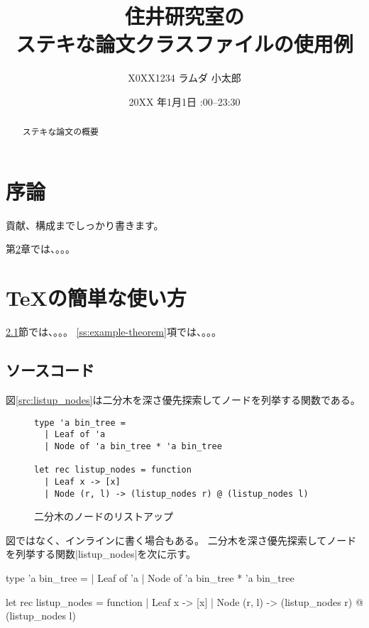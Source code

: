 \documentclass[uplatex]{sumiilab-paper}
\title{住井研究室の\\ステキな論文クラスファイルの使用例}
\author{X0XX1234 ラムダ 小太郎}
\institute{東北大学 工学部\\電気情報物理工学科}%
\date{20XX 年1月1日 \quad 23:00--23:30}
\theoremstyle{mystyle}
\numberwithin{definition}{chapter} %
\begin{document}
\frontmatter%

\maketitle

\begin{abstract}
ステキな論文の概要
\end{abstract}

\tableofcontents%

\mainmatter%

\chapter{序論}

貢献、構成までしっかり書きます。

\cite{Pierce:TypeSystems}

第\ref{c:how-to-use-tex}章では、。。。

\chapter{\TeX の簡単な使い方}
\label{c:how-to-use-tex}

\ref{s:source-code}節では、。。。
\ref{ss:example-theorem}項では、。。。

\section{ソースコード}
\label{s:source-code}

図\ref{src:listup_nodes}は二分木を深さ優先探索してノードを列挙する関数である。
\begin{figure}[t]
\begin{lstlisting}[label=src:listup_nodes]
type 'a bin_tree =
  | Leaf of 'a
  | Node of 'a bin_tree * 'a bin_tree

let rec listup_nodes = function
  | Leaf x -> [x]
  | Node (r, l) -> (listup_nodes r) @ (listup_nodes l)
\end{lstlisting}
\caption{二分木のノードのリストアップ}
\end{figure}

図ではなく、インラインに書く場合もある。
二分木を深さ優先探索してノードを列挙する関数|listup_nodes|を次に示す。
\begin{code}
type 'a bin_tree =
  | Leaf of 'a
  | Node of 'a bin_tree * 'a bin_tree

let rec listup_nodes = function
  | Leaf x -> [x]
  | Node (r, l) -> (listup_nodes r) @ (listup_nodes l)
\end{code}
\end{document}
